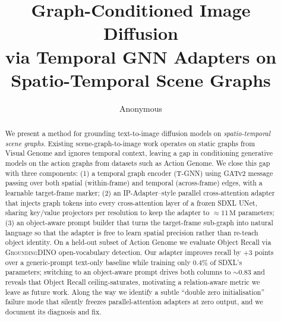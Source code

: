 \documentclass[11pt]{article}
\title{Graph-Conditioned Image Diffusion\\via Temporal GNN Adapters on Spatio-Temporal Scene Graphs}
\author{Anonymous}
\affil{University of Illinois Urbana--Champaign \\ CS598, Spring 2026 final report}
\date{}
\begin{document}
\maketitle

\begin{abstract}
We present a method for grounding text-to-image diffusion models on
\emph{spatio-temporal scene graphs}. Existing scene-graph-to-image work
operates on static graphs from Visual Genome and ignores temporal
context, leaving a gap in conditioning generative models on the action
graphs from datasets such as Action Genome.  We close this gap with three
components: (1) a temporal graph encoder (T-GNN) using GATv2 message
passing over both spatial (within-frame) and temporal (across-frame)
edges, with a learnable target-frame marker; (2) an
IP-Adapter--style parallel cross-attention adapter that injects graph
tokens into every cross-attention layer of a frozen SDXL UNet, sharing
key/value projectors per resolution to keep the adapter to $\approx
11\,\text{M}$ parameters; (3) an object-aware prompt builder that turns
the target-frame sub-graph into natural language so that the adapter is
free to learn spatial precision rather than re-teach object identity.
On a held-out subset of Action Genome we evaluate Object Recall via
\textsc{GroundingDINO} open-vocabulary detection. Our adapter improves
recall by $+3$ points over a generic-prompt text-only baseline while
training only $0.4\%$ of SDXL's parameters; switching to an
object-aware prompt drives both columns to $\sim 0.83$ and reveals
that Object Recall ceiling-saturates, motivating a relation-aware
metric we leave as future work. Along the way we identify a subtle
``double zero initialisation'' failure mode that silently freezes
parallel-attention adapters at zero output, and we document its
diagnosis and fix.
\end{abstract}

\end{document}
